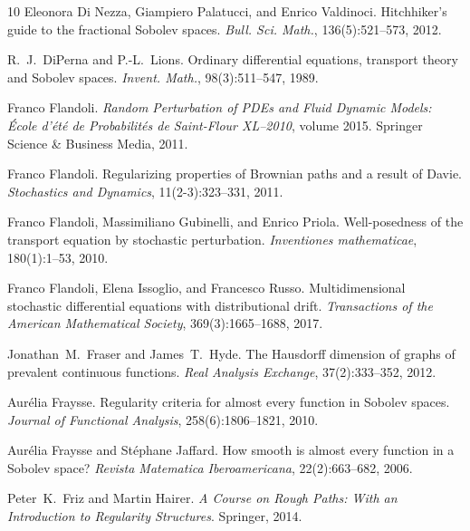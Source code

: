 \documentclass[10pt]{article}
\newcommand{\tmtextit}[1]{{\itshape{#1}}}
\begin{document}
\begin{thebibliography}{10}
  Eleonora Di Nezza, Giampiero Palatucci, and  Enrico
  Valdinoci. {\newblock}Hitchhiker's guide to the fractional Sobolev spaces.
  {\newblock}\tmtextit{Bull. Sci. Math.}, 136(5):521--573, 2012.{\newblock}
  
  R.~J.~DiPerna  and  P.-L.~Lions. {\newblock}Ordinary
  differential equations, transport theory and Sobolev spaces.
  {\newblock}\tmtextit{Invent. Math.}, 98(3):511--547, 1989.{\newblock}
  
  Franco Flandoli. {\newblock}\tmtextit{Random
  Perturbation of PDEs and Fluid Dynamic Models: {\'E}cole d'{\'e}t{\'e} de
  Probabilit{\'e}s de Saint-Flour XL--2010},  volume  2015.
  {\newblock}Springer Science \& Business Media, 2011.{\newblock}
  
  Franco Flandoli. {\newblock}Regularizing
  properties of Brownian paths and a result of Davie.
  {\newblock}\tmtextit{Stochastics and Dynamics}, 11(2-3):323--331,
  2011.{\newblock}
  
  Franco Flandoli, Massimiliano Gubinelli, and  Enrico
  Priola. {\newblock}Well-posedness of the transport equation by stochastic
  perturbation. {\newblock}\tmtextit{Inventiones mathematicae}, 180(1):1--53,
  2010.{\newblock}
  
  Franco Flandoli, Elena Issoglio, and  Francesco
  Russo. {\newblock}Multidimensional stochastic differential equations with
  distributional drift. {\newblock}\tmtextit{Transactions of the American
  Mathematical Society}, 369(3):1665--1688, 2017.{\newblock}
  
  Jonathan~M.~Fraser  and  James~T.~Hyde.
  {\newblock}The Hausdorff dimension of graphs of prevalent continuous
  functions. {\newblock}\tmtextit{Real Analysis Exchange}, 37(2):333--352,
  2012.{\newblock}
  
  Aur{\'e}lia Fraysse. {\newblock}Regularity criteria
  for almost every function in Sobolev spaces. {\newblock}\tmtextit{Journal of
  Functional Analysis}, 258(6):1806--1821, 2010.{\newblock}
  
  Aur{\'e}lia Fraysse  and  St{\'e}phane Jaffard.
  {\newblock}How smooth is almost every function in a Sobolev space?
  {\newblock}\tmtextit{Revista Matematica Iberoamericana}, 22(2):663--682,
  2006.{\newblock}
  
  Peter~K.~Friz  and  Martin Hairer.
  {\newblock}\tmtextit{A Course on Rough Paths: With an Introduction to
  Regularity Structures}. {\newblock}Springer, 2014.{\newblock}
  

\end{thebibliography}
\end{document}
